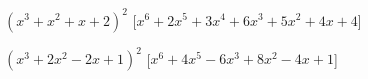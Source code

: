 \begin{esercizio}
\begin{enumeratea}
\item \(\left(x^3+x^2+x+2\right)^{2}\)
  \hfill [\(x^6 + 2x^5 + 3x^4 + 6x^3 + 5x^2 + 4x + 4\)]
\item \(\left(x^3+2x^2-2x+1\right)^{2}\)
  \hfill [\(x^{6} + 4 x^{5} - 6 x^{3} + 8 x^{2} - 4 x + 1\)]

\end{enumeratea}
\end{esercizio}
